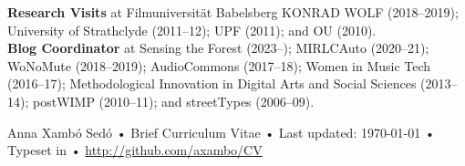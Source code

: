 \documentclass[10pt, a4paper]{article}
\begin{document}
{\textbf{Research Visits}} at Filmuniversität Babelsberg KONRAD WOLF (2018--2019); University of Strathclyde (2011--12); UPF (2011); and OU (2010).\\

{\textbf{Blog Coordinator}} at Sensing the Forest (2023--); MIRLCAuto (2020--21); WoNoMute (2018--2019); AudioCommons (2017--18); Women in Music Tech (2016--17); Methodological Innovation in Digital Arts and Social Sciences (2013--14); postWIMP (2010--11); and streetTypes (2006--09).


\begin{center}
{\scriptsize  Anna Xambó Sedó •\- Brief Curriculum Vitae •\- Last updated: \today\- •\- %
Typeset in \href{http://nitens.org/taraborelli/cvtex}{
\XeTeX } %
•\- 
\href{http://github.com/axambo/CV}{http://github.com/axambo/CV}}
\end{center}
\end{document}
